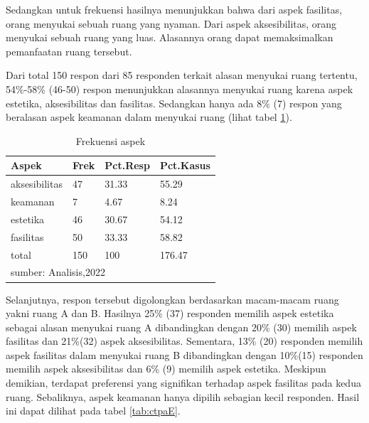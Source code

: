 \documentclass[11pt]{simartadv} %
\begin{document}
Sedangkan untuk frekuensi hasilnya menunjukkan bahwa dari aspek fasilitas, orang menyukai sebuah ruang yang nyaman. Dari aspek aksesibilitas, orang menyukai sebuah ruang yang luas. Alasannya orang dapat memaksimalkan pemanfaatan ruang tersebut.

Dari total 150 respon dari 85 responden terkait alasan menyukai ruang tertentu, 54\%-58\% (46-50) respon menunjukkan alasannya menyukai ruang karena aspek estetika, aksesibilitas dan fasilitas. Sedangkan hanya ada 8\% (7) respon yang beralasan aspek keamanan dalam menyukai ruang (lihat tabel \ref{tab:mrpaF}).

\begin{table}[ht]
\centering
\caption{Frekuensi aspek} 
\label{tab:mrpaF}
\begin{tabular}{llll}
  \toprule
Aspek & Frek & Pct.Resp & Pct.Kasus \\ 
  \midrule
aksesibilitas & 47 & 31.33 & 55.29 \\ 
  keamanan & 7 & 4.67 & 8.24 \\ 
  estetika & 46 & 30.67 & 54.12 \\ 
  fasilitas & 50 & 33.33 & 58.82 \\ 
  total & 150 & 100 & 176.47 \\ 
   \hline 
 \multicolumn{4}{l}{\scriptsize{sumber: Analisis,2022 }} \\
\end{tabular}
\end{table}

Selanjutnya, respon tersebut digolongkan berdasarkan macam-macam ruang yakni ruang A dan B. Hasilnya 25\% (37) responden memilih aspek estetika sebagai alasan menyukai ruang A dibandingkan dengan 20\% (30) memilih aspek fasilitas dan 21\%(32) aspek aksesibilitas. Sementara, 13\% (20) responden memilih aspek fasilitas dalam menyukai ruang B dibandingkan dengan 10\%(15) responden memilih aspek aksesibilitas dan 6\% (9) memilih aspek estetika. Meskipun demikian, terdapat preferensi yang signifikan terhadap aspek fasilitas pada kedua ruang. Sebaliknya, aspek keamanan hanya dipilih sebagian kecil responden. Hasil ini dapat dilihat pada tabel \ref{tab:ctpaE}.
\end{document}
